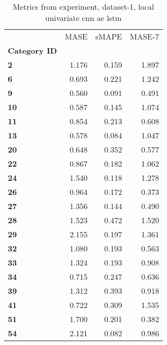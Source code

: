 \begin{table}[h]
\centering
\caption{Metrics from experiment, dataset-1, local univariate cnn ae lstm}
\label{table:local-univariate-cnn-ae-lstm-dataset-1}
\begin{tabular}{lrrr}
\toprule
{} &   MASE &  sMAPE &  MASE-7 \\
\textbf{Category ID} &        &        &         \\
\midrule
\textbf{2          } &  1.176 &  0.159 &   1.897 \\
\textbf{6          } &  0.693 &  0.221 &   1.242 \\
\textbf{9          } &  0.560 &  0.091 &   0.491 \\
\textbf{10         } &  0.587 &  0.145 &   1.074 \\
\textbf{11         } &  0.854 &  0.213 &   0.608 \\
\textbf{13         } &  0.578 &  0.084 &   1.047 \\
\textbf{20         } &  0.648 &  0.352 &   0.577 \\
\textbf{22         } &  0.867 &  0.182 &   1.062 \\
\textbf{24         } &  1.540 &  0.118 &   1.278 \\
\textbf{26         } &  0.964 &  0.172 &   0.373 \\
\textbf{27         } &  1.356 &  0.144 &   0.490 \\
\textbf{28         } &  1.523 &  0.472 &   1.520 \\
\textbf{29         } &  2.155 &  0.197 &   1.361 \\
\textbf{32         } &  1.080 &  0.193 &   0.563 \\
\textbf{33         } &  1.324 &  0.193 &   0.908 \\
\textbf{34         } &  0.715 &  0.247 &   0.636 \\
\textbf{39         } &  1.312 &  0.393 &   0.918 \\
\textbf{41         } &  0.722 &  0.309 &   1.535 \\
\textbf{51         } &  1.700 &  0.201 &   0.382 \\
\textbf{54         } &  2.121 &  0.082 &   0.986 \\
\bottomrule
\end{tabular}
\end{table}
